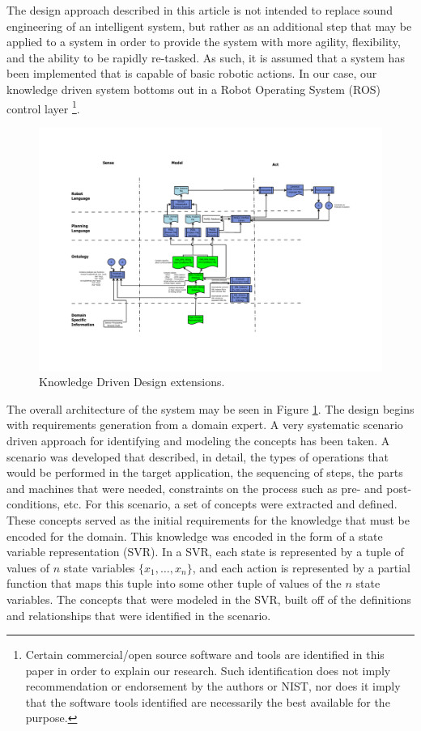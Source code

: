 The design approach described in this article is not intended to
replace sound engineering of an intelligent system, but rather as 
an additional step that may be applied to a system in order to provide
the system with more agility, flexibility, and the ability to be rapidly
re-tasked. As such, it is assumed that a system has been implemented
that is capable of basic robotic actions. In our case, our knowledge
driven system bottoms out in a Robot Operating System (ROS) control layer
\footnote{Certain commercial/open source software and tools are identified 
in this paper in order to explain our research. Such identification does not imply
recommendation or endorsement by the authors or NIST, nor does it 
imply that the software tools identified are necessarily the best available for the purpose.}.
\begin{figure}[ht!]
\begin{center}
\includegraphics[width=16cm]{images/KnowledgeDrivenRobotics.pdf}
\caption{Knowledge Driven Design extensions.}
\label{fig:DesignArchitecture}
\end{center}
\end{figure}

The overall architecture of the system may be seen in Figure \ref{fig:DesignArchitecture}.
The design begins with requirements generation from a domain expert. 
A very systematic scenario driven approach for identifying and 
modeling the concepts has been taken. A scenario 
was developed that described, in detail, the types of operations that would be performed 
in the target application, the sequencing of steps, the parts and machines that were 
needed, constraints 
on the process such as pre- and post-conditions, etc. For this scenario, a set of 
concepts were extracted and defined. These concepts served as the initial requirements 
for the knowledge that must be encoded for the domain.
This knowledge was encoded in the form of a state variable representation (SVR). 
In a SVR, each state is represented by a tuple of values of $n$ state variables 
$\lbrace x_1,\dots,x_n\rbrace$, and each action is represented by a partial function 
that maps this tuple into some other tuple of values of the $n$ state variables.
The concepts that were modeled in the SVR, built off of the 
definitions and relationships that were identified in the scenario. 

